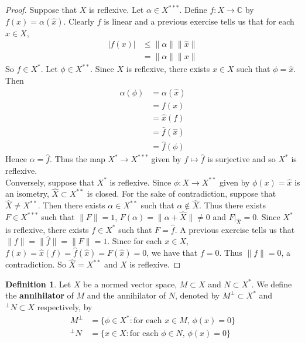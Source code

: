 \documentclass[12pt]{amsart}
\theoremstyle{definition}
\newtheorem{defn}[definition]{Definition}
\newcommand{\al}{\alpha}
\newcommand{\C}{\mathbb{C}}
\begin{document}
	\begin{proof}
		Suppose that $X$ is reflexive. Let $\al \in X^{***}$. Define $f :X \rightarrow \C$ by $f(x) = \al(\hat{x})$. Clearly $f$ is linear and a previous exercise tells us that for each $x \in X$, 
		\begin{align*}
			\vert f(x) \vert 
			& \leq \|\al \|\|\hat{x} \|\\
			&= \|\al \|\|x \|
		\end{align*}
		So $f \in X^*$.
		Let $\phi \in X^{**}$. Since $X$ is reflexive, there exists $x \in X$ such that $\phi = \hat{x}$. Then 
		\begin{align*}
			\al(\phi)
			&= \al(\hat{x})\\
			&= f(x)\\
			&= \hat{x}(f)\\
			&= \hat{f}(\hat{x})\\
			&= \hat{f}(\phi)
		\end{align*}
		Hence $\al = \hat{f}$. Thus the map $X^* \rightarrow X^{***}$ given by $f \mapsto \hat{f} $ is surjective and so $X^{*}$ is reflexive.\vspace{.5cm}\\
		Conversely, suppose that $X^*$ is reflexive. Since $\phi:X \rightarrow X^{**}$ given by $\phi(x) = \hat{x}$ is an isometry, $\widehat{X} \subset X^{**}$ is closed. For the sake of contradiction, suppose that $\widehat{X} \neq X^{**}$. Then there exists $\al \in X^{**}$ such that $\al \not \in \widehat{X}$. Thus there exists $F \in X^{***}$ such that $\|F \|= 1$, $F(\al) = \|\al + \widehat{X} \|\neq 0$ and $F|_{\widehat{X}}=0$. Since $X^*$ is reflexive, there exists $f \in X^*$ such that $F = \hat{f}$. A previous exercise tells us that $\|f \|= \|\hat{f} \|= \|F \|= 1$. Since for each $x \in X$, $f(x) = \hat{x}(f) = \hat{f}(\hat{x}) = F(\hat{x}) = 0$, we have that $f = 0$. Thus $\|f \|= 0$, a contradiction. So $\widehat{X} = X^{**}$ and $X$ is reflexive.
		
	\end{proof}
	
	
	\begin{defn}
	Let $X$ be a normed vector space, $M \subset X$ and $N \subset X^*$. We define the \textbf{annihilator} of $M$ and the annihilator of $N$, denoted by $M^{\perp} \subset X^*$ and $^{\perp}N \subset X$ respectively, by 
	\begin{align*}
	 M^{\perp} &= \{\phi \in X^*: \text{for each $x \in M$, $\phi(x) = 0$}\} \\
	 ^{\perp}N &= \{x \in X: \text{for each $\phi \in N$, $\phi(x) = 0$}\}
	\end{align*}
	\end{defn}	
	
\end{document}
